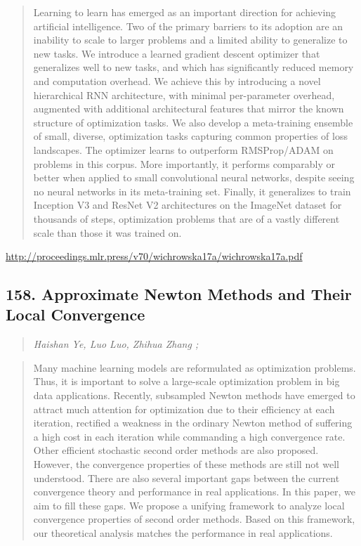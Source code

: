 \documentclass{article}
\begin{document}
\begin{quote}
    Learning to learn has emerged as an important direction for achieving artificial intelligence. Two of the primary barriers to its adoption are an inability to scale to larger problems and a limited ability to generalize to new tasks. We introduce a learned gradient descent optimizer that generalizes well to new tasks, and which has significantly reduced memory and computation overhead. We achieve this by introducing a novel hierarchical RNN architecture, with minimal per-parameter overhead, augmented with additional architectural features that mirror the known structure of optimization tasks. We also develop a meta-training ensemble of small, diverse, optimization tasks capturing common properties of loss landscapes. The optimizer learns to outperform RMSProp/ADAM on problems in this corpus. More importantly, it performs comparably or better when applied to small convolutional neural networks, despite seeing no neural networks in its meta-training set. Finally, it generalizes to train Inception V3 and ResNet V2 architectures on the ImageNet dataset for thousands of steps, optimization problems that are of a vastly different scale than those it was trained on.  
\end{quote}

\href{http://proceedings.mlr.press/v70/wichrowska17a/wichrowska17a.pdf}{http://proceedings.mlr.press/v70/wichrowska17a/wichrowska17a.pdf}

\subsection{158. Approximate Newton Methods and Their Local Convergence}

\begin{quote}
\footnotesize{\textit{Haishan Ye, Luo Luo, Zhihua Zhang ;}}

\end{quote}

\begin{quote}
    Many machine learning models are reformulated as optimization problems. Thus, it is important to solve a large-scale optimization problem in big data applications. Recently, subsampled Newton methods have emerged to attract much attention for optimization due to their efficiency at each iteration, rectified a weakness in the ordinary Newton method of suffering a high cost in each iteration while commanding a high convergence rate. Other efficient stochastic second order methods are also proposed. However, the convergence properties of these methods are still not well understood. There are also several important gaps between the current convergence theory and performance in real applications. In this paper, we aim to fill these gaps. We propose a unifying framework to analyze local convergence properties of second order methods. Based on this framework, our theoretical analysis matches the performance in real applications.  
\end{quote}
\end{document}
